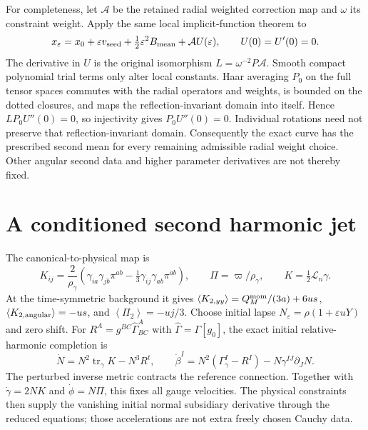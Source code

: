 \documentclass[11pt]{article}
\newcommand{\eps}{\varepsilon}
\newcommand{\Lie}{\mathcal L}
\newcommand{\av}[1]{\left\langle #1\right\rangle}
\begin{document}
For completeness, let $\mathcal A$ be the retained radial weighted
correction map and $\omega$ its constraint weight. Apply the same local
implicit-function theorem to
\begin{equation}
 x_\eps=x_0+\eps v_{\rm seed}+\tfrac12\eps^2B_{\rm mean}
             +\mathcal A U(\eps),\qquad U(0)=U'(0)=0. \label{eq:ift}
\end{equation}
The derivative in $U$ is the original isomorphism
$L=\omega^{-2}P\mathcal A$. Smooth compact polynomial trial terms only
alter local constants. Haar averaging $P_0$ on the full tensor spaces
commutes with the radial operators and weights, is bounded on the dotted
closures, and maps the reflection-invariant domain into itself. Hence
$LP_0U''(0)=0$, so injectivity gives $P_0U''(0)=0$. Individual rotations
need not preserve that reflection-invariant domain. Consequently the exact
curve has the prescribed second mean for every remaining admissible radial
weight choice. Other angular second data and higher parameter derivatives
are not thereby fixed.

\section{A conditioned second harmonic jet}

The canonical-to-physical map is
\begin{equation}
 K_{ij}=\frac{2}{\rho_\gamma}
 \left(\gamma_{ia}\gamma_{jb}\pi^{ab}
       -\tfrac13\gamma_{ij}\gamma_{ab}\pi^{ab}\right),\qquad
 \Pi=\varpi/\rho_\gamma,\qquad K=\tfrac12\Lie_n\gamma.
 \label{eq:canonical}
\end{equation}
At the time-symmetric background it gives
$\av{K_{2,yy}}=Q_M^{\rm mom}/(3a)+6us$,
$\av{K_{2,\rm angular}}=-us$, and $\av{\Pi_2}=-uj/3$.
Choose initial lapse $N_\eps=\rho(1+\eps uY)$ and zero shift.
For $R^A=g^{BC}\widehat\Gamma^A_{BC}$ with
$\widehat\Gamma=\Gamma[g_0]$, the exact initial relative-harmonic
completion is
\begin{equation}
 \dot N=N^2\operatorname{tr}_\gamma K-N^3R^t,\qquad
 \dot\beta^I=N^2(\Gamma_\gamma^I-R^I)-N\gamma^{IJ}\partial_JN.
 \label{eq:gaugeinitial}
\end{equation}
The perturbed inverse metric contracts the reference connection. Together
with $\dot\gamma=2NK$ and $\dot\phi=N\Pi$, this fixes all gauge
velocities. The physical constraints then supply the vanishing initial
normal subsidiary derivative through the reduced equations; those
accelerations are not extra freely chosen Cauchy data.
\end{document}
